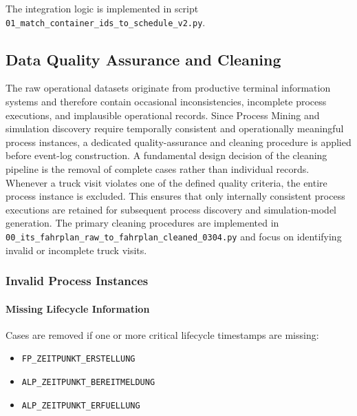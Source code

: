         The integration logic is implemented in script \texttt{01\_match\_container\_ids\_to\_schedule\_v2.py}.
        

        \subsection{Data Quality Assurance and Cleaning} 
        
        The raw operational datasets originate from productive terminal information systems and therefore contain occasional inconsistencies, incomplete process executions, and implausible operational records. Since Process Mining and simulation discovery require temporally consistent and operationally meaningful process instances, a dedicated quality-assurance and cleaning procedure is applied before event-log construction. A fundamental design decision of the cleaning pipeline is the removal of complete cases rather than individual records. 
        Whenever a truck visit violates one of the defined quality criteria, the entire process instance is excluded. This ensures that only internally consistent process executions are retained for subsequent process discovery and simulation-model generation. The primary cleaning procedures are implemented in \texttt{00\_its\_fahrplan\_raw\_to\_fahrplan\_cleaned\_0304.py} and focus on identifying invalid or incomplete truck visits. 
        
            \subsubsection{Invalid Process Instances}
            
            \paragraph{Missing Lifecycle Information} 
            Cases are removed if one or more critical lifecycle timestamps are missing: 
            \begin{itemize} 
            \item \texttt{FP\_ZEITPUNKT\_ERSTELLUNG} 
            \item \texttt{ALP\_ZEITPUNKT\_BEREITMELDUNG} 
            \item \texttt{ALP\_ZEITPUNKT\_ERFUELLUNG} 
            \end{itemize} 
            
